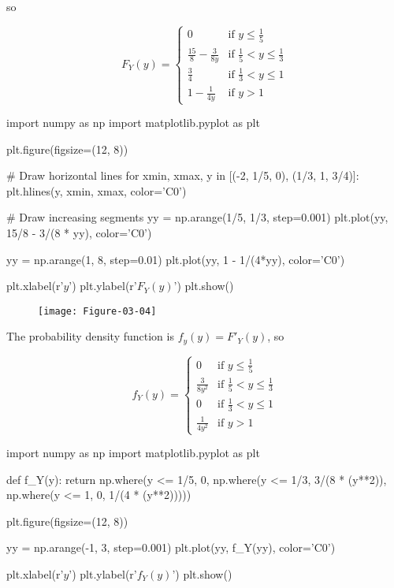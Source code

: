 so

\[ F_Y(y) = \begin{cases}
0 &\text{if } y \leq \frac{1}{5} \\
\frac{15}{8} - \frac{3}{8y} &\text{if } \frac{1}{5} < y \leq \frac{1}{3} \\
\frac{3}{4} &\text{if } \frac{1}{3} < y \leq 1 \\
1 - \frac{1}{4y} &\text{if } y > 1
\end{cases} \]

\begin{python}
import numpy as np
import matplotlib.pyplot as plt

plt.figure(figsize=(12, 8))

# Draw horizontal lines
for xmin, xmax, y in [(-2, 1/5, 0), (1/3, 1, 3/4)]:
    plt.hlines(y, xmin, xmax, color='C0')

    
# Draw increasing segments
yy = np.arange(1/5, 1/3, step=0.001)
plt.plot(yy, 15/8 - 3/(8 * yy), color='C0')

yy = np.arange(1, 8, step=0.01)
plt.plot(yy, 1 - 1/(4*yy), color='C0')
    
plt.xlabel(r'$y$')
plt.ylabel(r'$F_Y(y)$')
plt.show()
\end{python}

\begin{figure}[H]
\centering
\texttt{[image: Figure-03-04]}
\end{figure}

The probability density function is \(f_y(y) = F'_Y(y)\), so

\[ f_Y(y) = \begin{cases}
0  &\text{if } y \leq \frac{1}{5} \\
\frac{3}{8y^{2}} &\text{if } \frac{1}{5} < y \leq \frac{1}{3} \\
0 &\text{if } \frac{1}{3} < y \leq 1 \\
\frac{1}{4y^{2}} &\text{if } y > 1
\end{cases}\]

\begin{python}
import numpy as np
import matplotlib.pyplot as plt

def f_Y(y):
    return np.where(y <= 1/5, 0, np.where(y <= 1/3, 3/(8 * (y**2)), 
                    np.where(y <= 1, 0, 1/(4 * (y**2)))))

plt.figure(figsize=(12, 8))

yy = np.arange(-1, 3, step=0.001)
plt.plot(yy, f_Y(yy), color='C0')
    
plt.xlabel(r'$y$')
plt.ylabel(r'$f_Y(y)$')
plt.show()
\end{python}

